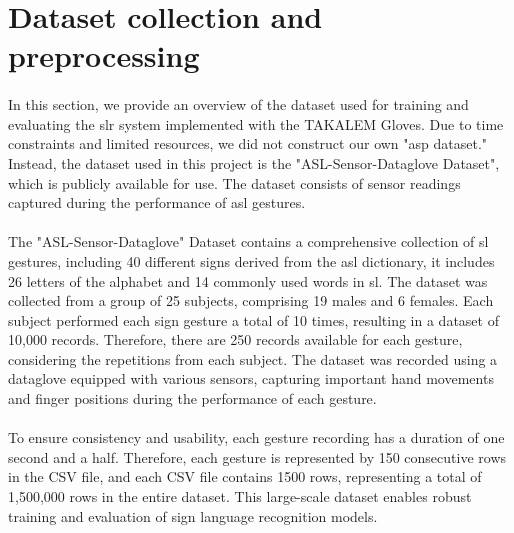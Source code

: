 \section{Dataset collection and preprocessing}
\paragraph{}
In this section, we provide an overview of the dataset used for training and evaluating the \ac{slr} system implemented with the TAKALEM Gloves. Due to time constraints and limited resources, we did not construct our own "\ac{asp} dataset." Instead, the dataset used in this project is the "ASL-Sensor-Dataglove Dataset", which is publicly available for use. The dataset consists of sensor readings captured during the performance of \ac{asl} gestures.
\paragraph{}
The "ASL-Sensor-Dataglove" Dataset contains a comprehensive collection of \ac{sl} gestures, including 40 different signs derived from the \ac{asl} dictionary, it includes 26 letters of the alphabet and 14 commonly used words in \ac{sl}. The dataset was collected from a group of 25 subjects, comprising 19 males and 6 females. Each subject performed each sign gesture a total of 10 times, resulting in a dataset of 10,000 records. Therefore, there are 250 records available for each gesture, considering the repetitions from each subject. The dataset was recorded using a dataglove equipped with various sensors, capturing important hand movements and finger positions during the performance of each gesture.
\paragraph{}
To ensure consistency and usability, each gesture recording has a duration of one second and a half. Therefore, each gesture is represented by 150 consecutive rows in the CSV file, and each CSV file contains 1500 rows, representing a total of 1,500,000 rows in the entire dataset. This large-scale dataset enables robust training and evaluation of sign language recognition models.
